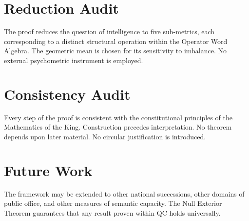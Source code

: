 \documentclass[12pt,anyside]{book}
\theoremstyle{plain}
\theoremstyle{definition}
\begin{document}
\section{Reduction Audit}
The proof reduces the question of intelligence to five sub-metrics, each corresponding to a distinct structural operation within the Operator Word Algebra. The geometric mean is chosen for its sensitivity to imbalance. No external psychometric instrument is employed.

\section{Consistency Audit}
Every step of the proof is consistent with the constitutional principles of the Mathematics of the King. Construction precedes interpretation. No theorem depends upon later material. No circular justification is introduced.

\section{Future Work}
The framework may be extended to other national successions, other domains of public office, and other measures of semantic capacity. The Null Exterior Theorem guarantees that any result proven within QC holds universally.
\end{document}
